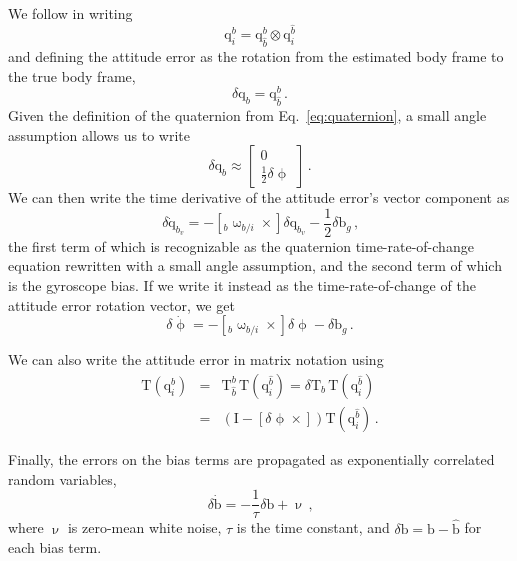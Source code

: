\documentclass[12pt]{article}
\newcommand{\Tf}[2]{\ensuremath{\mathrm{T}_{#1}^{#2}}}
\newcommand{\skewsymm}[1]{\ensuremath{\left[ #1 \times \right]}}
\newcommand{\eye}{\ensuremath{\mathrm{I}}}
\newcommand{\Qf}[2]{\ensuremath{\mathrm{q}_{#1}^{#2}}}
\newcommand{\vecb}{\ensuremath{\mathrm{b}}}
\begin{document}
We follow \citet{Bishop2016} in writing
\begin{equation}
\Qf{i}{b} = \Qf{\hat{b}}{b} \otimes \Qf{i}{\hat{b}}
\end{equation}
and defining the attitude error as the rotation from the estimated body frame to the true body frame,
\begin{equation}
\delta\mathrm{q}_b = \Qf{\hat{b}}{b}\,\text{.}
\end{equation}
Given the definition of the quaternion from Eq.~\ref{eq:quaternion}, a small angle assumption allows us to write
\begin{equation}
\delta\mathrm{q}_b \approx \begin{bmatrix} 0 \\ \frac{1}{2}\delta\upphi \end{bmatrix}\,\text{.}
\end{equation}
We can then write the time derivative of the attitude error's vector component as
\begin{equation}
\delta\dot{\mathrm{q}}_{b_v} = -\skewsymm{{}_b\upomega_{b/i}} \delta\mathrm{q}_{b_v} - \frac{1}{2} \delta\vecb_g\,\text{,}
\end{equation}
the first term of which is recognizable as the quaternion time-rate-of-change equation rewritten with a small angle assumption, and the second term of which is the gyroscope bias. If we write it instead as the time-rate-of-change of the attitude error rotation vector, we get
\begin{equation}
\delta\dot{\upphi} = -\skewsymm{{}_b\upomega_{b/i}} \delta\upphi - \delta\vecb_g\,\text{.}
\end{equation}

We can also write the attitude error in matrix notation using
\begin{eqnarray}
\mathrm{T}(\Qf{i}{b}) &=& \Tf{\hat{b}}{b} \, \mathrm{T}(\Qf{i}{\hat{b}}) = \delta\mathrm{T}_b \, \mathrm{T}(\Qf{i}{\hat{b}}) \nonumber \\
 &=& \left(\eye - \skewsymm{\delta\upphi}\right)\mathrm{T}(\Qf{i}{\hat{b}})\,\text{.}
\end{eqnarray}

Finally, the errors on the bias terms are propagated as exponentially correlated random variables, 
\begin{equation}
\delta\dot{\vecb} = -\frac{1}{\tau}\delta\vecb + \upnu\,\text{,}
\end{equation}
where $\upnu$ is zero-mean white noise, $\tau$ is the time constant, and $\delta\vecb = \vecb - \hat{\vecb}$ for each bias term.
\end{document}
